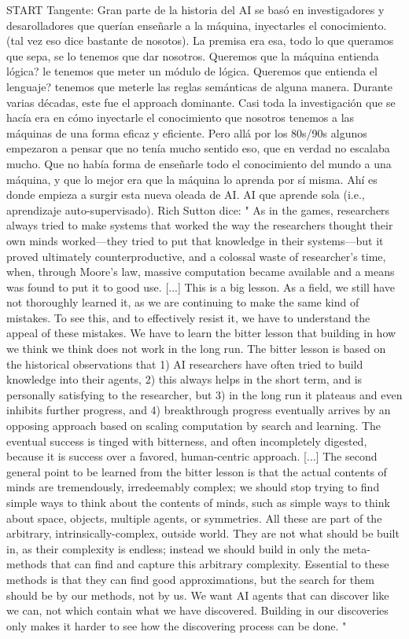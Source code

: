 START Tangente:
Gran parte de la historia del AI se basó en investigadores y desarolladores que querían enseñarle a la máquina, inyectarles el conocimiento. 
(tal vez eso dice bastante de nosotos). La premisa era esa, todo lo que queramos que sepa, se lo tenemos que dar nosotros. Queremos que la 
máquina entienda lógica? le tenemos que meter un módulo de lógica. Queremos que entienda el lenguaje? tenemos que meterle las reglas semánticas de 
alguna manera. Durante varias décadas, este fue el approach dominante. Casi toda la investigación que se hacía era en cómo inyectarle el conocimiento 
que nosotros tenemos a las máquinas de una forma eficaz y eficiente. Pero allá por los 80s/90s algunos empezaron a pensar que no tenía mucho sentido
eso, que en verdad no escalaba mucho. Que no había forma de enseñarle todo el conocimiento del mundo a una máquina, y que lo mejor era que la máquina
lo aprenda por sí misma. Ahí es donde empieza a surgir esta nueva oleada de AI. AI que aprende sola (i.e., aprendizaje auto-supervisado). 
Rich Sutton dice: 
"
As in the games, researchers always tried to make systems that worked the way the researchers thought their own minds 
worked---they tried to put that knowledge in their systems---but it proved ultimately counterproductive, and a colossal 
waste of researcher's time, when, through Moore's law, massive computation became available and a means was found to put it to good use.
[...]
This is a big lesson. As a field, we still have not thoroughly learned it, as we are continuing to make the same kind of mistakes. 
To see this, and to effectively resist it, we have to understand the appeal of these mistakes. We have to learn the bitter lesson
that building in how we think we think does not work in the long run. The bitter lesson is based on the historical observations 
that 1) AI researchers have often tried to build knowledge into their agents, 2) this always helps in the short term, and is 
personally satisfying to the researcher, but 3) in the long run it plateaus and even inhibits further progress, and 
4) breakthrough progress eventually arrives by an opposing approach based on scaling computation by search and learning. 
The eventual success is tinged with bitterness, and often incompletely digested, because it is success over a favored, 
human-centric approach. 
[...]
The second general point to be learned from the bitter lesson is that the actual contents of minds are tremendously, 
irredeemably complex; we should stop trying to find simple ways to think about the contents of minds, such as simple 
ways to think about space, objects, multiple agents, or symmetries. All these are part of the arbitrary, intrinsically-complex, 
outside world. They are not what should be built in, as their complexity is endless; instead we should build in only the 
meta-methods that can find and capture this arbitrary complexity. Essential to these methods is that they can find good 
approximations, but the search for them should be by our methods, not by us. We want AI agents that can discover like 
we can, not which contain what we have discovered. Building in our discoveries only makes it harder to see how the discovering process can be done.
"


